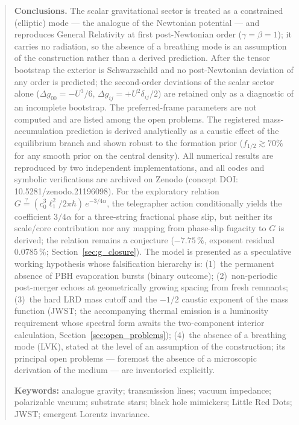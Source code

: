 \documentclass[11pt,a4paper]{article}
\theoremstyle{plain}
\theoremstyle{remark}
\begin{document}
\begin{abstract}
\noindent\textbf{Conclusions.} The scalar gravitational sector is treated as a constrained (elliptic) mode --- the analogue of the Newtonian potential --- and reproduces General Relativity at first post-Newtonian order ($\gamma = \beta = 1$); it carries no radiation, so the absence of a breathing mode is an assumption of the construction rather than a derived prediction. After the tensor bootstrap the exterior is Schwarzschild and no post-Newtonian deviation of any order is predicted; the second-order deviations of the scalar sector alone ($\Delta g_{00} = -U^3/6$, $\Delta g_{ij} = +U^2\delta_{ij}/2$) are retained only as a diagnostic of an incomplete bootstrap. The preferred-frame parameters are not computed and are listed among the open problems. The registered mass-accumulation prediction is derived analytically as a caustic effect of the equilibrium branch and shown robust to the formation prior ($f_{1/2} \gtrsim 70\%$ for any smooth prior on the central density). All numerical results are reproduced by two independent implementations, and all codes and symbolic verifications are archived on Zenodo (concept DOI: 10.5281/zenodo.21196098). For the exploratory relation $G \stackrel{?}{=} (c_0^3\ell_1^2/2\pi\hbar)\,e^{-3/4\alpha}$, the telegrapher action conditionally yields the coefficient $3/4\alpha$ for a three-string fractional phase slip, but neither its scale/core contribution nor any mapping from phase-slip fugacity to $G$ is derived; the relation remains a conjecture ($-7.75\,\%$, exponent residual $0.0785\,\%$; Section~\ref{sec:g_closure}). The model is presented as a speculative working hypothesis whose falsification hierarchy is: (1)~the permanent absence of PBH evaporation bursts (binary outcome); (2)~non-periodic post-merger echoes at geometrically growing spacing from fresh remnants; (3)~the hard LRD mass cutoff and the $-1/2$ caustic exponent of the mass function (JWST; the accompanying thermal emission is a luminosity requirement whose spectral form awaits the two-component interior calculation, Section~\ref{sec:open_problems}); (4)~the absence of a breathing mode (LVK), stated at the level of an assumption of the construction; its principal open problems --- foremost the absence of a microscopic derivation of the medium --- are inventoried explicitly.

\medskip
\noindent\textbf{Keywords:} analogue gravity; transmission lines; vacuum impedance; polarizable vacuum; substrate stars; black hole mimickers; Little Red Dots; JWST; emergent Lorentz invariance.
\end{abstract}
\end{document}
